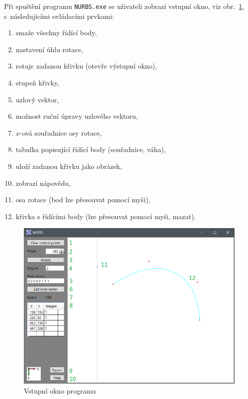 Při spuštění programu \texttt{NURBS.exe} se uživateli zobrazí vstupní okno, viz obr.~\ref{obrInputWin}, s~následujícími ovládacími prvkami:
\begin{multicols}{2}
	\begin{enumerate}
		\item smaže všechny řídící body,
		\item nastavení úhlu rotace,
		\item rotuje zadanou křivku (otevře výstupní okno),
		\item stupeň křivky,
		\item uzlový vektor,
		\item možnost ruční úpravy uzlového vektoru,
		\item $x$-ová souřadnice osy rotace,
		\item tabulka popisující řídící body (souřadnice, váha),
		\item uloží zadanou křivku jako obrázek,
		\item zobrazí nápovědu,
		\item osa rotace (bod lze přesouvat pomocí myši),
		\item křivka s řídícími body (lze přesouvat pomocí myši, mazat).
	\end{enumerate}
\end{multicols}
\begin{figure}[!h]
	\begin{center}
		\includegraphics*[width=\textwidth]{obr/InputWin}
	\end{center}
	\caption{Vstupní okno programu}
	\label{obrInputWin}
\end{figure}

